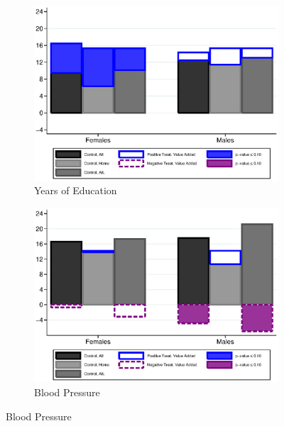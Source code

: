 \begin{figure}[!htbp]
\begin{subfigure}[h]{0.495\textwidth}
	\centering
	\caption{Years of Education}
	\label{fig:means-years}
	\includegraphics[width=\textwidth]{output/control-50a-years_30y}
\end{subfigure} %
\begin{subfigure}[h]{0.495\textwidth}
	\centering
	\caption{Blood Pressure}
	\label{fig:means-bp}
	\includegraphics[width=\textwidth]{output/control-50a-bp}
\end{subfigure}


\end{figure}
